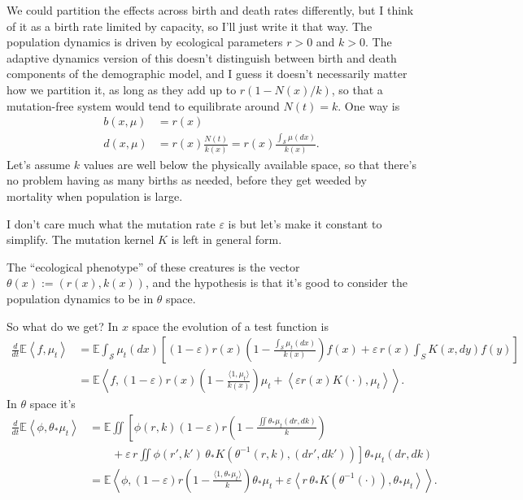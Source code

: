 \documentclass[11pt]{amsart}
\theoremstyle{remark}
\theoremstyle{definition}
\begin{document}
We could partition the effects across birth and death rates differently,
but I think of it as a birth rate limited by capacity, so I'll
just write it that way. The population dynamics is driven by
ecological parameters $r>0$ and $k>0$.
The adaptive dynamics version of this doesn't distinguish between
birth and death components of the demographic model, and I guess
it doesn't necessarily matter how we partition it, as long as they
add up to $r(1-N(x)/k)$, so that a mutation-free system would
tend to equilibrate around $N(t)=k$.
One way is
\begin{align*}
	b(x,\mu) &= r(x) \\
	d(x,\mu) &= r(x) \frac{N(t)}{k(x)} = r(x) \frac{\int_{\mathcal{S}} \mu(dx)}{k(x)}.
\end{align*}
Let's assume $k$ values are well below the physically available space,
so that there's no problem having as many births as needed, before
they get weeded by mortality when population is large.

I don't care much what the mutation rate $\varepsilon$ is but let's make it
constant to simplify.
The mutation kernel $K$ is left in general form.

The ``ecological phenotype'' of these creatures is the vector
$\theta(x) := (r(x),k(x))$, and the hypothesis is that it's good to
consider the population dynamics to be in $\theta$ space.

So what do we get? In $x$ space the evolution of a test function is
\begin{align*}
	\frac{d}{dt} \mathbb{E}\left\langle f, \mu_t \right\rangle 
	&= \mathbb{E} \int_{\mathcal{S}} \mu_t(dx) \left[ (1-\varepsilon) r(x) \left( 1 - \frac{\int_{\mathcal{S}} \mu_t(dx)}{k(x)} \right) f(x) 
	 + \varepsilon\,r(x) \int_{S} K(x,dy) f(y) \right] \\
	&= \mathbb{E}\left\langle f, (1-\varepsilon) r(x) \left(1 - \frac{\langle 1,\mu_t\rangle}{k(x)} \right) \mu_t + \left\langle \varepsilon r(x) K(\cdot), \mu_t \right\rangle \right\rangle .
\end{align*}
%
In $\theta$ space it's
\begin{align*}
	\frac{d}{dt} \mathbb{E}\left\langle \phi, \theta_{*}\mu_t \right\rangle
	&= \mathbb{E} \iint \left[ \phi(r,k) (1-\varepsilon)
		r \left( 1 - \frac{\iint \theta_{*}\mu_t(dr,dk)}{k} \right) \right. \\
	& \left. \qquad\mbox{} + \varepsilon\, r \iint \phi(r',k')\, \theta_{*}K(\theta^{-1}(r,k),(dr',dk')) \right] \theta_{*}\mu_t(dr,dk) \\
	&= \mathbb{E}\left\langle \phi,
		(1-\varepsilon) r \left( 1 - \frac{\langle 1,\theta_{*}\mu_t\rangle}{k} \right) \theta_*{\mu_t}
		+ \varepsilon \left\langle r\,\theta_{*}K(\theta^{-1}(\cdot)), \theta_{*}\mu_t \right\rangle \right\rangle .
\end{align*}
\end{document}
